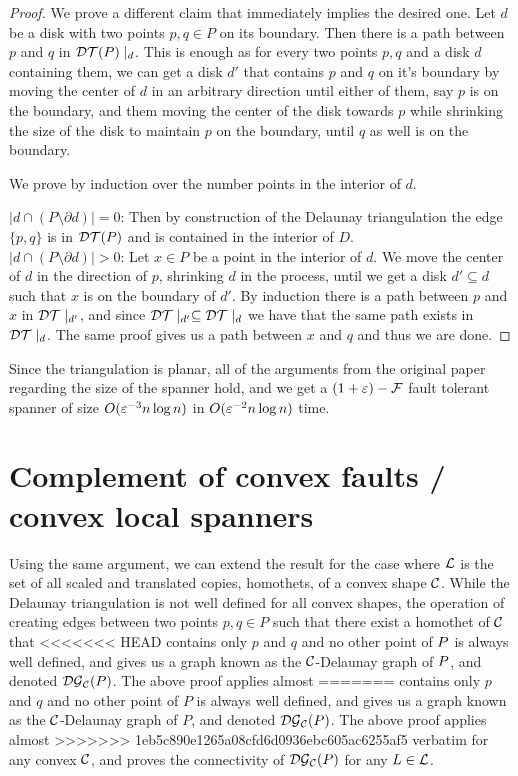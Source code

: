 \documentclass[12pt]{article}%
\begin{document}
\begin{proof}
    We prove a different claim that immediately implies the desired
    one. Let $d$ be a disk with two points $p,q\in P$ on its
    boundary. Then there is a path between $p$ and $q$ in
    $\mathcal{DT}(P)\mid_d$. This is enough as for every two points $p,q$ and a
    disk $d$ containing them, we can get a disk $d'$ that contains $p$
    and $q$ on it's boundary by moving the center of $d$ in an
    arbitrary direction until either of them, say $p$ is on the
    boundary, and them moving the center of the disk towards $p$ while
    shrinking the size of the disk to maintain $p$ on the boundary,
    until $q$ as well is on the boundary.
    
    We prove by induction over the number points in the interior of
    $d$.
    
    $|d\cap (P\setminus \partial d)| = 0$: Then by construction of the Delaunay triangulation the edge $\{p,q\}$ is in $\mathcal{DT}(P)$ and is contained in the interior of $D$.\\
    
    $|d\cap (P\setminus \partial d)| > 0$: Let $x\in P$ be a point in
    the interior of $d$. We move the center of $d$ in the direction of
    $p$, shrinking $d$ in the process, until we get a disk
    $d'\subseteq d$ such that $x$ is on the boundary of $d'$. By
    induction there is a path between $p$ and $x$ in $\mathcal{DT}\mid_{d'}$,
    and since $\mathcal{DT}\mid_{d'}\subseteq \mathcal{DT}\mid_{d}$ we have that the
    same path exists in $\mathcal{DT}\mid_{d}$. The same proof gives us a path
    between $x$ and $q$ and thus we are done.
    
\end{proof}

Since the triangulation is planar, all of the arguments from the
original paper regarding the size of the spanner hold, and we get a
$(1+\varepsilon)-\mathcal{F}$ fault tolerant spanner of size $O(\varepsilon^{-3}n\log n)$ in
$O(\varepsilon^{-2}n\log n)$ time.

\section{Complement of convex faults / convex local spanners}
Using the same argument, we can extend the result for the case where
$\mathcal{L}$ is the set of all scaled and translated copies, homothets, of a
convex shape $\mathcal{C}$. While the Delaunay triangulation is not well
defined for all convex shapes, the operation of creating edges between
two points $p,q\in P$ such that there exist a homothet of $\mathcal{C}$ that
<<<<<<< HEAD
contains only $p$ and $q$ and no other point of $P$ is always well
defined, and gives us a graph known as the $\mathcal{C}$-Delaunay graph of
$P$, and denoted $\mathcal{DG}_{\mathcal{C}}(P)$. The above proof applies almost
=======
contains only $p$ and $q$ and no other point of $P$ is always well
defined, and gives us a graph known as the $\mathcal{C}$-Delaunay graph of
$P$, and denoted $\mathcal{DG}_{\mathcal{C}}(P)$. The above proof applies almost
>>>>>>> 1eb5c890e1265a08cfd6d0936ebc605ac6255af5
verbatim for any convex $\mathcal{C}$, and proves the connectivity of
$\mathcal{DG}_{\mathcal{C}}(P)$ for any $L\in \mathcal{L}$.
\end{document}
